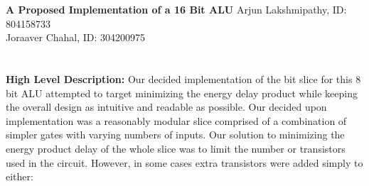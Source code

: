 \documentclass[12pt]{article}
\begin{document}
	\begin{center}
		\large \textbf{A Proposed Implementation of a 16 Bit ALU}
		\normalsize
		\newline \newline
		Arjun Lakshmipathy, ID: 804158733 \\
		Joraaver Chahal, ID: 304200975
	\end{center}
  \section{}

	\textbf{High Level Description:}
	\newline \newline
	Our decided implementation of the bit slice for this 8 bit ALU attempted to target
	minimizing the energy delay product while keeping the overall design as intuitive and 
	readable as possible. Our decided upon implementation was a reasonably modular 
	slice comprised of a combination of simpler gates with varying numbers of inputs. Our
	solution to minimizing the energy product delay of the whole slice was to limit the number
	or transistors used in the circuit. However, in some cases extra transistors were added
	simply to either:
	
\end{document}
